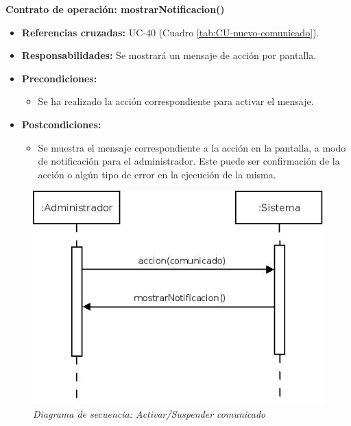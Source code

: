 \textbf{Contrato de operación: mostrarNotificacion()}
\begin{itemize}
\item \textbf{Referencias cruzadas:} UC-40 (Cuadro \ref{tab:CU-nuevo-comunicado}).
\item \textbf{Responsabilidades:} Se mostrará un mensaje de acción por pantalla.
\item \textbf{Precondiciones:} 
 \begin{itemize}
\item Se ha realizado la acción correspondiente para activar el mensaje.
\end {itemize}
\item \textbf{Postcondiciones:} 
 \begin{itemize}
\item Se muestra el mensaje correspondiente a la acción en la pantalla, a modo de notificación para el administrador. Este puede ser confirmación de la acción o algún tipo de error en la ejecución de la misma.
\end {itemize}
\end {itemize}


\vspace{10mm}

\begin{figure}[H]
\centering
  \includegraphics[scale=.55]{img/secuencias/suspender-activar-comunicado.jpeg}
  \caption{\textit{Diagrama de secuencia: Activar/Suspender comunicado}}
  \label{fig:secuencia-suspender-activar-comunicado}
\end{figure}

